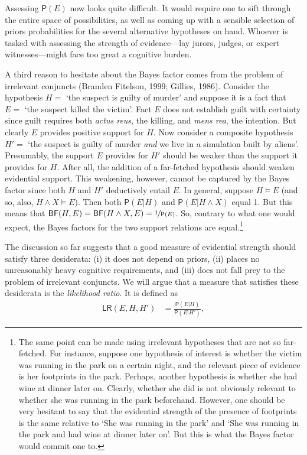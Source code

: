 \documentclass[
  letterpaper,
  DIV=11,
  numbers=noendperiod]{scrartcl}
\newcommand{\et}{\wedge}
\newcommand{\pr}[1]{\mathsf{P}(#1)}
\begin{document}
\noindent Assessing \(\pr{E}\) now looks quite difficult. It would
require one to sift through the entire space of possibilities, as well
as coming up with a sensible selection of priors probabilities for the
several alternative hypotheses on hand. Whoever is tasked with assessing
the strength of evidence---lay jurors, judges, or expert
witnesses---might face too great a cognitive burden.

A third reason to hesitate about the Bayes factor comes from the problem
of irrelevant conjuncts (Branden Fitelson, 1999; Gillies, 1986).
Consider the hypothesis \(H =\) `the suspect is guilty of murder' and
suppose it is a fact that \(E =\) `the suspect killed the victim'. Fact
\(E\) does not establish guilt with certainty since guilt requires both
\emph{actus reus}, the killing, and \emph{mens rea}, the intention. But
clearly \(E\) provides positive support for \(H\). Now consider a
composite hypothesis \(H'=\) `the suspect is guilty of murder
\textit{and} we live in a simulation built by aliens'. Presumably, the
support \(E\) provides for \(H'\) should be weaker than the support it
provides for \(H\). After all, the addition of a far-fetched hypothesis
should weaken evidential support. This weakening, however, cannot be
captured by the Bayes factor since both \(H\) and \(H'\) deductively
entail \(E\). In general, suppose \(H\models E\) (and so, also,
\(H \et X \models E\)). Then both \(\pr{E\vert H}\) and
\(\pr{E \vert H \et X}\) equal 1. But this means that
\(\mathsf{BF}(H,E) = \mathsf{BF}(H \et X, E) = \nicefrac{1}{\pr{E}}\).
So, contrary to what one would expect, the Bayes factors for the two
support relations are equal.\footnote{The same point can be made using
  irrelevant hypotheses that are not so far-fetched. For instance,
  suppose one hypothesis of interest is whether the victim was running
  in the park on a certain night, and the relevant piece of evidence is
  her footprints in the park. Perhaps, another hypothesis is whether she
  had wine at dinner later on. Clearly, whether she did is not obviously
  relevant to whether she was running in the park beforehand. However,
  one should be very hesitant to say that the evidential strength of the
  presence of footprints is the same relative to `She was running in the
  park' and `She was running in the park and had wine at dinner later
  on'. But this is what the Bayes factor would commit one to.}

The discussion so far suggests that a good measure of evidential
strength should satisfy three desiderata: (i) it does not depend on
priors, (ii) places no unreasonably heavy cognitive requirements, and
(iii) does not fall prey to the problem of irrelevant conjuncts. We will
argue that a measure that satisfies these desiderata is the
\emph{likelihood ratio}. It is defined as \begin{align*}
\mathsf{LR}(E,H,H') & = \frac{\pr{E \vert H}}{\pr{E \vert H'}},
\end{align*}
\end{document}
